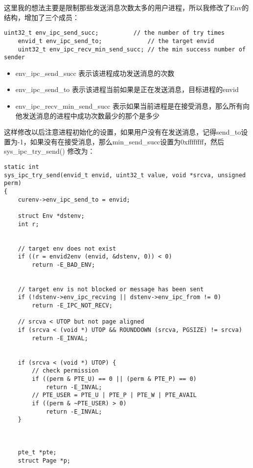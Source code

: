 \documentclass{article}
\newcommand{\funcname}[1]{{\ttfamily \small #1}}
\begin{document}
\begin{CJK*}{UTF8}{gkai}
这里我的想法主要是限制那些发送消息次数太多的用户进程，所以我修改了Env的结构，增加了三个成员：


\begin{lstlisting}[style=ccode, title={\scriptsize \ttfamily \bfseries inc/env.h}]
    uint32_t env_ipc_send_succ;          // the number of try times
    envid_t env_ipc_send_to;             // the target envid
    uint32_t env_ipc_recv_min_send_succ; // the min success number of sender
\end{lstlisting}

\begin{itemize}
\item{env\_ipc\_send\_succ 表示该进程成功发送消息的次数}
\item{env\_ipc\_send\_to 表示该进程当前如果是正在发送消息，目标进程的envid}
\item{env\_ipc\_recv\_min\_send\_succ 表示如果当前进程是在接受消息，那么所有向他发送消息的进程中成功次数最少的那个是多少}
\end{itemize}

这样修改以后注意进程初始化的设置，如果用户没有在发送消息，记得send\_to设置为-1，如果没有在接受消息，那么min\_send\_succ设置为0xffffffff，然后 \funcname{ sys\_ipc\_try\_send() } 修改为：

\begin{lstlisting}[style=ccode, title={\scriptsize \ttfamily \bfseries kern/syscall.c sys\_ipc\_try\_send()}]
static int
sys_ipc_try_send(envid_t envid, uint32_t value, void *srcva, unsigned perm)
{
    curenv->env_ipc_send_to = envid;

    struct Env *dstenv;
    int r;


    // target env does not exist
    if ((r = envid2env (envid, &dstenv, 0)) < 0)
        return -E_BAD_ENV;


    // target env is not blocked or message has been sent
    if (!dstenv->env_ipc_recving || dstenv->env_ipc_from != 0)
        return -E_IPC_NOT_RECV;

    // srcva < UTOP but not page aligned
    if (srcva < (void *) UTOP && ROUNDDOWN (srcva, PGSIZE) != srcva)
        return -E_INVAL;


    if (srcva < (void *) UTOP) {
        // check permission
        if ((perm & PTE_U) == 0 || (perm & PTE_P) == 0)
            return -E_INVAL;
        // PTE_USER = PTE_U | PTE_P | PTE_W | PTE_AVAIL
        if ((perm & ~PTE_USER) > 0)
            return -E_INVAL;
    }

    

    pte_t *pte;
    struct Page *p;


\end{lstlisting}
\end{CJK*}
\end{document}
